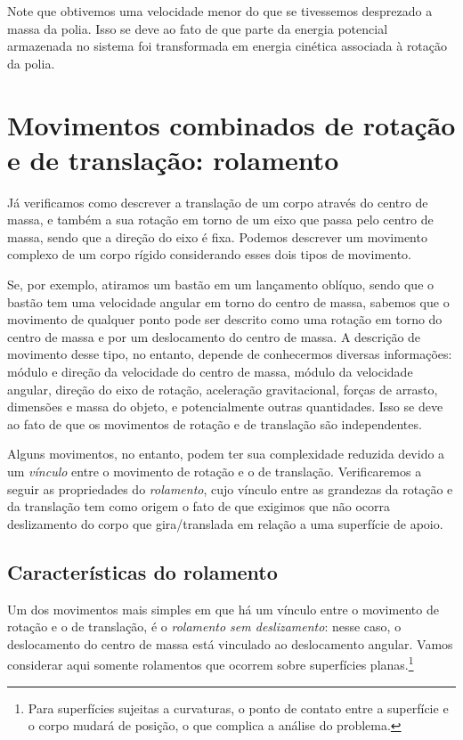 Note que obtivemos uma velocidade menor do que se tivessemos desprezado a massa da polia. Isso se deve ao fato de que parte da energia potencial armazenada no sistema foi transformada em energia cinética associada à rotação da polia.


\section{Movimentos combinados de rotação e de translação: rolamento}

Já verificamos como descrever a translação de um corpo através do centro de massa, e também a sua  rotação em torno de um eixo que passa pelo centro de massa, sendo que a direção do eixo é fixa. Podemos descrever um movimento complexo de um corpo rígido considerando esses dois tipos de movimento.

Se, por exemplo, atiramos um bastão em um lançamento oblíquo, sendo que o bastão tem uma velocidade angular em torno do centro de massa, sabemos que o movimento de qualquer ponto pode ser descrito como uma rotação em torno do centro de massa e por um deslocamento do centro de massa. A descrição de movimento desse tipo, no entanto, depende de conhecermos diversas informações: módulo e direção da velocidade do centro de massa, módulo da velocidade angular, direção do eixo de rotação, aceleração gravitacional, forças de arrasto, dimensões e massa do objeto, e potencialmente outras quantidades. Isso se deve ao fato de que os movimentos de rotação e de translação são independentes.

Alguns movimentos, no entanto, podem ter sua complexidade reduzida devido a um \emph{vínculo} entre o movimento de rotação e o de translação. Verificaremos a seguir as propriedades do \emph{rolamento}, cujo vínculo entre as grandezas da rotação e da translação tem como origem o fato de que exigimos que não ocorra deslizamento do corpo que gira/translada em relação a uma superfície de apoio.

\subsection{Características do rolamento}

Um dos movimentos mais simples em que há um vínculo entre o movimento de rotação e o de translação, é o \emph{rolamento sem deslizamento}: nesse caso, o deslocamento do centro de massa está vinculado ao deslocamento angular. Vamos considerar aqui somente rolamentos que ocorrem sobre superfícies planas.\footnote{Para superfícies sujeitas a curvaturas, o ponto de contato entre a superfície e o corpo mudará de posição, o que complica a análise do problema.}

